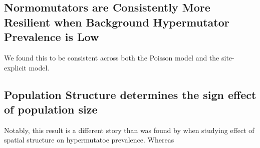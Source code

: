 

\subsection{Normomutators are Consistently More Resilient when Background Hypermutator Prevalence is Low}



We found this to be consistent across both the Poisson model and the site-explicit model.

\subsection{Population Structure determines the sign effect of population size}



Notably, this result is a different story than was found by \citet{raynes2019migration} when studying effect of spatial structure on hypermutatoe prevalence.
Whereas
